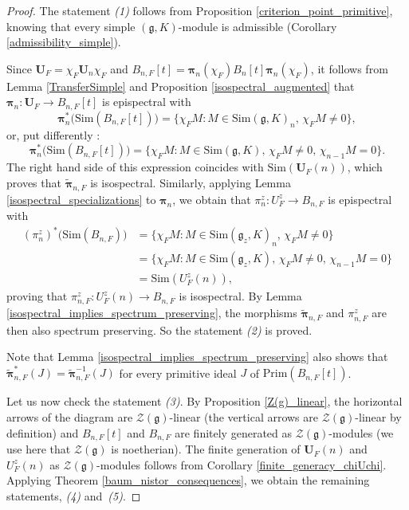\documentclass{amsart}
\theoremstyle{definition}
\begin{document}
\begin{proof}
    The statement \textit{(1)} follows from Proposition \ref{criterion_point_primitive}, knowing that every simple $(\bm{\mathfrak{g}},K)$-module is admissible (Corollary \ref{admissibility_simple}).
    
    Since $\bm{U}_F = \chi_F \bm{U}_n \chi_F$ and $B_{n,F}[t] = \bm{\pi}_n(\chi_F) B_n[t] \bm{\pi}_n(\chi_F)$, it follows from Lemma \ref{TransferSimple} and Proposition \ref{isospectral_augmented} that $\bm{\pi}_n : \bm{U}_F \to B_{n,F}[t]$ is epispectral with
    \[\bm{\pi}_n^*\big( \mathrm{Sim}(B_{n,F}[t])\big) = \{ \chi_{F} M : M \in \mathrm{Sim}(\bm{\mathfrak{g}},K)_n,\, \chi_{F} M \neq 0 \},\]
    or, put differently :
    \[\bm{\pi}_n^*\big( \mathrm{Sim}(B_{n,F}[t])\big) = \{ \chi_{F} M : M \in \mathrm{Sim}(\bm{\mathfrak{g}},K),\, \chi_{F} M \neq 0, \, \chi_{n-1}M = 0 \}.\]
    The right hand side of this expression coincides with $\mathrm{Sim}(\bm{U}_F(n))$, which proves that $\tilde{\bm{\pi}}_{n,F}$ is isospectral. Similarly, applying Lemma \ref{isospectral_specializations} to $\bm{\pi}_n$, we obtain that $\pi_n^z : U_F^z \to B_{n,F}$ is epispectral with
    \begin{align*}
        (\pi_n^{z})^*\big(\mathrm{Sim} (B_{n,F})\big) &= \{ \chi_{F} M : M \in \mathrm{Sim}(\bm{\mathfrak{g}}_z,K)_n,\, \chi_{F} M \neq 0 \}\\
        & = \{ \chi_{F} M : M \in \mathrm{Sim}(\bm{\mathfrak{g}}_z,K),\, \chi_{F} M \neq 0, \, \chi_{n-1}M = 0 \}\\
        & = \mathrm{Sim}(U_F^z(n)),
    \end{align*}
    proving that $\pi_{n,F}^z : U_F^z(n) \to B_{n,F}$ is isospectral. By Lemma \ref{isospectral_implies_spectrum_preserving}, the morphisms $\tilde{\bm{\pi}}_{n,F}$ and $\pi_{n,F}^z$ are then also spectrum preserving. So the statement \textit{(2)} is proved.

    Note that Lemma \ref{isospectral_implies_spectrum_preserving} also shows that $\tilde{\bm{\pi}}^*_{n,F}(J)  = \tilde{\bm{\pi}}^{-1}_{n,F}(J)$ for every primitive ideal $J$ of $\mathrm{Prim}(B_{n,F}[t])$.
    
    Let us now check the statement \textit{(3)}. By Proposition \ref{Z(g)_linear}, the horizontal arrows of the diagram are $\mathcal{Z}(\bm{\mathfrak{g}})$-linear (the vertical arrows are $\mathcal{Z}(\bm{\mathfrak{g}})$-linear by definition) and $B_{n,F}[t]$ and $B_{n,F}$ are finitely generated as $\mathcal{Z}(\bm{\mathfrak{g}})$-modules (we use here that $\mathcal{Z}(\bm{\mathfrak{g}})$ is noetherian). The finite generation of $\bm{U}_{F}(n)$ and $U_F^z(n)$ as $\mathcal{Z}(\bm{\mathfrak{g}})$-modules follows from Corollary \ref{finite_generacy_chiUchi}. Applying Theorem \ref{baum_nistor_consequences}, we obtain the remaining statements, \textit{(4)} and~\textit{(5)}.
\end{proof}
\end{document}
